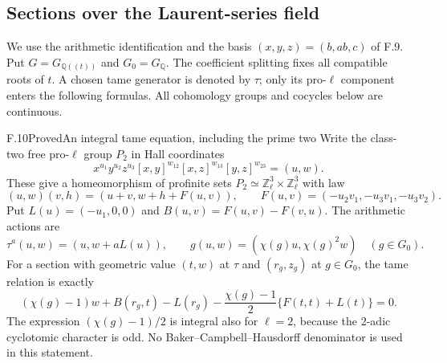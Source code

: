 \subsection{Sections over the Laurent-series field}

We use the arithmetic identification and the basis $(x,y,z)=(b,ab,c)$
of F.9. Put $G=G_{\mathbb Q((t))}$ and
$G_0=G_{\mathbb Q}$. The coefficient splitting fixes all compatible
roots of $t$. A chosen tame generator is denoted by $\tau$;
only its pro-$\ell$ component enters the following formulas.
All cohomology groups and cocycles below are continuous.

\begin{statement}{F.10}{Proved}{An integral tame equation, including the prime two}
Write the class-two free pro-$\ell$ group $P_2$ in Hall coordinates
\[
 x^{u_1}y^{u_2}z^{u_3}
 [x,y]^{w_{12}}[x,z]^{w_{13}}[y,z]^{w_{23}}=(u,w).
\]
These give a homeomorphism of profinite sets
$P_2\simeq\mathbb Z_\ell^3\times\mathbb Z_\ell^3$ with law
\[
 (u,w)(v,h)=(u+v,w+h+F(u,v)),\qquad
 F(u,v)=(-u_2v_1,-u_3v_1,-u_3v_2).
\]
Put $L(u)=(-u_1,0,0)$ and
$B(u,v)=F(u,v)-F(v,u)$.
The arithmetic actions are
\[
 \tau^a(u,w)=(u,w+aL(u)),\qquad
 g(u,w)=(\chi(g)u,\chi(g)^2w)\quad(g\in G_0).
\]
For a section with geometric value $(t,w)$ at $\tau$ and
$(r_g,z_g)$ at $g\in G_0$, the tame relation is exactly
\[
 (\chi(g)-1)w+B(r_g,t)-L(r_g)
 -\frac{\chi(g)-1}{2}\{F(t,t)+L(t)\}=0.                 \tag{F.10.1}
\]
The expression $(\chi(g)-1)/2$ is integral also for $\ell=2$,
because the $2$-adic cyclotomic character is odd.
No Baker--Campbell--Hausdorff denominator is used in this statement.
\end{statement}
